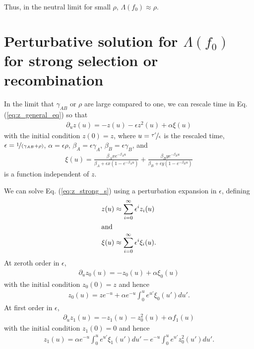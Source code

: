 \documentclass[11pt]{article}
\begin{document}
Thus, in the neutral limit for small $\rho$, $\Lambda(f_0) \approx \rho$.

\section*{Perturbative solution for $\Lambda(f_0)$ for strong selection or recombination}

In the limit that $\gamma_{AB}$ or $\rho$ are large compared to one, we can rescale time in Eq. (\ref{eq:z_general_eq}) so that
\begin{align}\label{eq:z_strong_s}
    \partial_{u} z(u) = -z(u) - \epsilon z^2(u) + \alpha \xi(u)
\end{align}
with the initial condition $z(0) = z$, where $u= \nicefrac{\tau'}{\epsilon}$ is the rescaled time, $\epsilon = \nicefrac{1}{(\gamma_{AB}+\rho)}$, $\alpha = \epsilon \rho$, $\beta_A = \epsilon \gamma_A$, $\beta_B = \epsilon \gamma_B$, and 
\begin{align}
    \xi(u) = \frac{\beta_Axe^{-\beta_A u}}{\beta_A + \epsilon x(1-e^{-\beta_A u})} + \frac{\beta_B ye^{-\beta_B u}}{\beta_B + \epsilon y(1-e^{-\beta_B u})}
\end{align}
is a function independent of $z$.

We can solve Eq. (\ref{eq:z_strong_s}) using a perturbation expansion in $\epsilon$, defining 
\begin{subequations}\begin{align}
    z (u) &\approx \sum_{i=0}^\infty \epsilon^i z_i (u) \\
    \intertext{and}
    \xi (u) &\approx \sum_{i=0}^\infty \epsilon^i \xi_i (u).\label{eq:f(u)_series}
\end{align}\end{subequations}
At zeroth order in $\epsilon$,
\begin{align}
    \partial_u z_0(u) = -z_0(u) + \alpha \xi_0(u)  
\end{align}
with the initial condition $z_0(0) = z$ and hence 
\begin{align}
    z_0(u) = ze^{-u} + \alpha e^{-u} \int_0^u e^{u'} \xi_0(u') du'.
\end{align}
At first order in $\epsilon$,
\begin{align}
    \partial_u z_1(u) = -z_1(u) -z_0^2(u) + \alpha f_1(u) 
\end{align}
with the initial condition $z_1(0) = 0$ and hence 
\begin{align}
    z_1(u) = \alpha e^{-u} \int_0^u e^{u'} \xi_1(u') du' - e^{-u} \int_0^u e^{u'} z_0^2 (u') du'.
\end{align}
\end{document}
